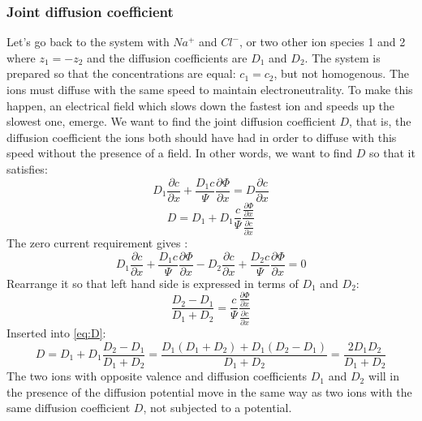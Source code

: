 \documentclass{article}
\begin{document}
\subsubsection{Joint diffusion coefficient}\label{joint diffusion}
Let's go back to the system with $Na^+$ and $Cl^-$, or two other ion species 1 and 2 where $z_1 = -z_2$ and the diffusion coefficients are $D_1$ and $D_2$. The system is prepared so that the concentrations are equal: $c_1 = c_2$, but not homogenous. The ions must diffuse with the same speed to maintain electroneutrality. To make this happen, an electrical field which slows down the fastest ion and speeds up the slowest one, emerge.  We want to find the joint diffusion coefficient $D$, that is, the diffusion coefficient the ions both should have had in order to diffuse with this speed without the presence of a field. In other words, we want to find $D$ so that it satisfies:
\begin{equation}
D_1 \frac{\partial c}{\partial x} + \frac{D_1 c}{\Psi}\frac{\partial \Phi}{\partial x} = D\frac{\partial c}{\partial x}
\end{equation} 
\begin{equation}\label{eq:D}
D = D_1 + D_1 \frac{c}{\Psi}\frac{\frac{\partial \Phi}{\partial x}}{\frac{\partial c}{\partial x}}
\end{equation}
The zero current requirement gives :
\begin{equation}
D_1 \frac{\partial c}{\partial x} + \frac{D_1 c}{\Psi}\frac{\partial \Phi}{\partial x} - D_2 \frac{\partial c}{\partial x} + \frac{D_2 c}{\Psi}\frac{\partial \Phi}{\partial x} = 0
\end{equation}
Rearrange it so that left hand side is expressed in terms of $D_1$ and $D_2$:
\begin{equation}
\frac{D_2 - D_1}{D_1 + D_2} = \frac{c}{\Psi}\frac{\frac{\partial \Phi}{\partial x}}{\frac{\partial c}{\partial x}}
\end{equation}
Inserted into \ref{eq:D}: 
\begin{equation}
D = D_1 +D_1 \frac{D_2 - D_1}{D_1 + D_2} = \frac{D_1(D_1 + D_2)+D_1(D_2-D_1)}{D_1+D_2} = \frac{2D_1D_2}{D_1+D_2}
\end{equation}
The two ions with opposite valence and diffusion coefficients $D_1$ and $D_2$ will in the presence of the diffusion potential move in the same way as two ions with the same diffusion coefficient $D$, not subjected to a potential. 
\end{document}
